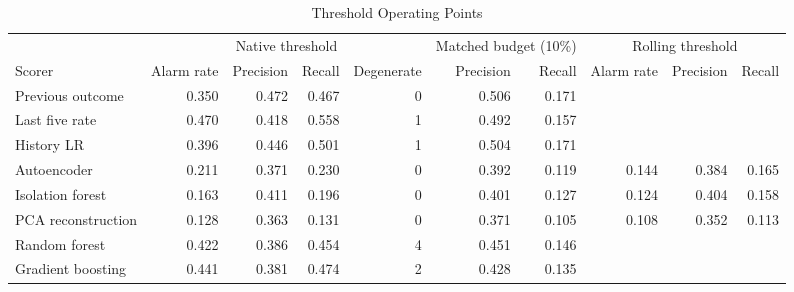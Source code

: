 \begin{table}[htbp]
\centering
\footnotesize\setlength{\tabcolsep}{3.5pt}
\caption{Threshold Operating Points}
\label{tab:operating}
\begin{tabular}{lrrrrrrrrr}
\toprule
 & \multicolumn{4}{c}{Native threshold} & \multicolumn{2}{c}{Matched budget (10\%)} & \multicolumn{3}{c}{Rolling threshold} \\
\cmidrule(lr){2-5} \cmidrule(lr){6-7} \cmidrule(lr){8-10}
Scorer & Alarm rate & Precision & Recall & Degenerate & Precision & Recall & Alarm rate & Precision & Recall \\
\midrule
Previous outcome & 0.350 & 0.472 & 0.467 & 0 & 0.506 & 0.171 &  & &  \\
Last five rate & 0.470 & 0.418 & 0.558 & 1 & 0.492 & 0.157 &  & &  \\
History LR & 0.396 & 0.446 & 0.501 & 1 & 0.504 & 0.171 &  & &  \\
Autoencoder & 0.211 & 0.371 & 0.230 & 0 & 0.392 & 0.119 & 0.144 & 0.384 & 0.165 \\
Isolation forest & 0.163 & 0.411 & 0.196 & 0 & 0.401 & 0.127 & 0.124 & 0.404 & 0.158 \\
PCA reconstruction & 0.128 & 0.363 & 0.131 & 0 & 0.371 & 0.105 & 0.108 & 0.352 & 0.113 \\
Random forest & 0.422 & 0.386 & 0.454 & 4 & 0.451 & 0.146 &  & &  \\
Gradient boosting & 0.441 & 0.381 & 0.474 & 2 & 0.428 & 0.135 &  & &  \\
\bottomrule
\end{tabular}
\end{table}
